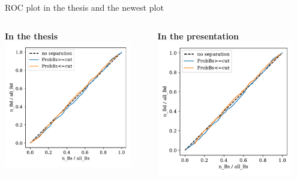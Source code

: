 \documentclass[aspectratio=1610, 10pt]{beamer}
\begin{document}
\begin{frame}{ROC plot in the thesis and the newest plot}
  \begin{columns}
    \begin{column}{0.5\textwidth}
      \centering
      \textbf{In the thesis}
      \includegraphics[width=0.9\textwidth]{images/data_roc.pdf}
    \end{column}
    \begin{column}{0.5\textwidth}
      \centering
      \textbf{In the presentation}
      \includegraphics[width=0.9\textwidth]{images/data_roc_new.pdf}
    \end{column}
  \end{columns}
\end{frame}
\end{document}
